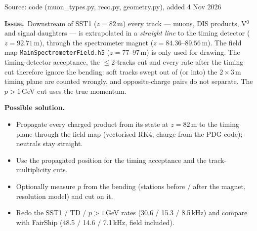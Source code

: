 \documentclass[10pt,a4paper]{article}
\newcommand{\st}[1]{\textbf{#1}}
\newcommand{\stOPEN}{\textcolor{shorange}{\st{OPEN}}}
\newenvironment{issue}[5]{%
  \begin{tcolorbox}[breakable,colback=white,colframe=cernblue,boxrule=0.6pt,arc=1.5mm,
    left=6pt,right=6pt,top=4pt,bottom=4pt,
    title={\textbf{#1}\quad #2\hfill{\normalfont\small priority #3\quad\colorbox{white}{#4}}},
    coltitle=white,colbacktitle=cernblue,fonttitle=\normalsize]
  {\color{greytxt}\footnotesize Source: #5}\par\smallskip}{\end{tcolorbox}\vspace{2pt}}
\newcommand{\prob}{\par\noindent\textbf{\color{cernblue}Issue.}\ }
\newcommand{\sol}{\par\smallskip\noindent\textbf{\color{shorange}Possible solution.}\ }
\begin{document}
\begin{issue}{A6}{Spectrometer field map not used}{A}{\stOPEN}{code (muon\_types.py, reco.py, geometry.py), added 4 Nov 2026}
\prob Downstream of SST1 ($z=82$\,m) every track --- muons, DIS products, V$^0$ and signal daughters --- is
extrapolated in a \emph{straight line} to the timing detector ($z=92.71$\,m), through the spectrometer magnet
($z=84.36$--$89.56$\,m). The field map \texttt{MainSpectrometerField.h5} ($z=77$--$97$\,m) is only used for
drawing. The timing-detector acceptance, the $\le2$-tracks cut and every rate after the timing cut therefore
ignore the bending: soft tracks swept out of (or into) the $2\times3$\,m timing plane are counted wrongly, and
opposite-charge pairs do not separate. The $p>1$\,GeV cut uses the true momentum.
\sol
\begin{itemize}
\item Propagate every charged product from its state at $z=82$\,m to the timing plane through the field map
      (vectorised RK4, charge from the PDG code); neutrals stay straight.
\item Use the propagated position for the timing acceptance and the track-multiplicity cuts.
\item Optionally measure $p$ from the bending (stations before / after the magnet, resolution model) and cut on it.
\item Redo the SST1 / TD / $p>1$\,GeV rates (30.6 / 15.3 / 8.5\,kHz) and compare with FairShip
      (48.5 / 14.6 / 7.1\,kHz, field included).
\end{itemize}
\end{issue}
\end{document}

